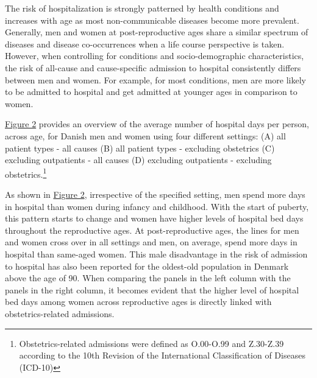 The risk of hospitalization is strongly patterned by health 
conditions and increases with age as most non-communicable 
diseases become more prevalent.\citep{hanlon2000link,
hanlon2007analysis,hippisley2013predicting,campisi2013aging,
leening2014sex,rasmussen2018absolute} Generally, men and women 
at post-reproductive ages share a similar spectrum of diseases 
and disease co-occurrences when a life course perspective 
is taken.\citep{jensen2014temporal,westergaard2019population} 
However, when controlling for conditions and socio-demographic 
characteristics, the risk of all-cause and 
cause-specific admission to hospital consistently differs between 
men and women. For example, for most conditions, men are more 
likely to be admitted to hospital and get admitted at younger ages 
in comparison to women.\citep{hanlon2000link,case2005sex,
karampampa2013trends,luben2016predicting,westergaard2019population} 

\hyperref[ch1:fig2]{Figure 2} provides an overview of the average 
number of hospital days per person, across age, for Danish men 
and women using four different settings: (A) all patient types - 
all causes (B) all patient types - excluding obstetrics (C) excluding 
outpatients - all causes (D) excluding outpatients - excluding 
obstetrics.\footnote{Obstetrics-related admissions were defined 
as O.00-O.99 and Z.30-Z.39 according to the 10th Revision of the 
International Classification of Diseases (ICD-10)} 

As shown in \hyperref[ch1:fig2]{Figure 2}, irrespective of the 
specified setting, men spend more days in hospital than women 
during infancy and childhood. With the start of puberty, this 
pattern starts to change and women have higher levels of hospital 
bed days throughout the reproductive ages. At post-reproductive 
ages, the lines for men and women cross over in all settings and 
men, on average, spend more days in hospital than same-aged women. 
This male disadvantage in the risk of admission to hospital has 
also been reported for the oldest-old population in Denmark above 
the age of 90.\citep{engberg2009centenarians,oksuzyan2013changes} 
When comparing the panels in the left column with the panels in 
the right column, it becomes evident that the higher level of 
hospital bed days among women across reproductive ages is directly 
linked with obstetrics-related admissions.\\


